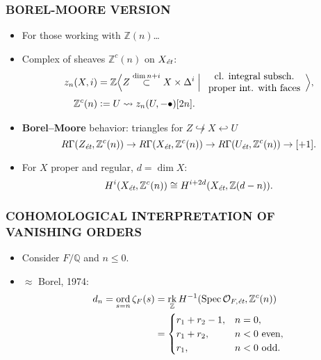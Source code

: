 \documentclass[handout]{beamer}
\newcommand{\QQ}{\mathbb{Q}}
\newcommand{\ZZ}{\mathbb{Z}}
\newcommand{\dfn}{\mathrel{\mathop:}=}
\DeclareMathOperator{\ord}{ord}
\DeclareMathOperator{\rk}{rk}
\DeclareMathOperator{\Spec}{Spec}
\newcommand{\et}{\text{\it ét}}
\begin{document}

\begin{frame}
  \frametitle{BOREL-MOORE VERSION}

  \begin{itemize}
  \item<2-> For those working with $\ZZ (n)$\dots

  \item<3-> Complex of sheaves $\ZZ^c (n)$ on $X_\et$:
    \begin{align*}
      z_n (X,i) & = \ZZ \Bigl<Z \stackrel{\dim n+i}{\subset} X \times \Delta^i \Bigm| \begin{array}{c} \text{cl. integral subsch.} \\
                                                                                        \text{proper int. with faces}\end{array} \Bigr>, \\
      \ZZ^c (n) & \dfn U \rightsquigarrow z_n (U, -\bullet) [2n].
    \end{align*}

  \item<4-> \textbf{Borel--Moore} behavior: triangles for
    $Z \not\hookrightarrow X \hookleftarrow U$
    \[ R\Gamma (Z_\et, \ZZ^c (n)) \to
      R\Gamma (X_\et, \ZZ^c (n)) \to
      R\Gamma (U_\et, \ZZ^c (n)) \to [+1]. \]

  \item<5-> For $X$ proper and regular, $d = \dim X$:
    \[ H^i (X_\et, \ZZ^c (n)) \cong H^{i+2d} (X_\et, \ZZ (d-n)). \]
  \end{itemize}
\end{frame}


\begin{frame}
  \frametitle{COHOMOLOGICAL INTERPRETATION OF\\
    VANISHING ORDERS}

  \begin{itemize}
  \item<2-> Consider $F/\QQ$ and $n \le 0$.

  \item<3-> $\approx$ Borel, 1974:
    \begin{align*}
      d_n = \ord_{s = n} \zeta_F (s) & =
                                       \rk_\ZZ H^{-1} (\Spec \mathcal{O}_{F,\et}, \ZZ^c (n)) \\
                                     & =
                                       \begin{cases}
                                         r_1 + r_2 - 1, & n = 0, \\
                                         r_1 + r_2, & n < 0\text{ even}, \\
                                         r_1, & n < 0\text{ odd}.
                                       \end{cases}
    \end{align*}
  \end{itemize}
\end{frame}
\end{document}
